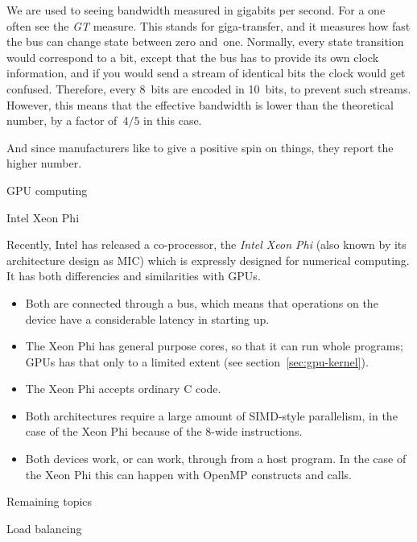  We are used to seeing bandwidth
measured in gigabits per second. For a  one often
see the \emph{GT} measure. This stands
for giga-transfer, and it measures how fast the bus can change state
between zero and~one.
Normally, every state transition would correspond to a bit, except that
the bus has to provide its own clock information, and if you would send a stream
of identical bits the clock would get confused. Therefore, every 8~bits
are encoded in 10~bits, to prevent such streams. However, this means
that the effective bandwidth is lower than the theoretical number,
by a factor of~$4/5$ in this case.

And since manufacturers like to give a positive spin on things,
they report the higher number.

 {GPU computing}
\label{sec:gpu}


 {Intel Xeon Phi}

Recently, Intel has released a co-processor, the \emph{Intel Xeon Phi}
(also known by its architecture design as \ac{MIC})
which is expressly designed for numerical computing.
It has both differencies and similarities with \acp{GPU}.
\begin{itemize}
\item Both are connected through a  bus, which means
  that operations on the device have a considerable latency in
  starting up.
\item The Xeon Phi has general purpose cores, so that it can run whole
  programs; \acp{GPU} has that only to a limited extent (see
  section~\ref{sec:gpu-kernel}).
\item The Xeon Phi accepts ordinary C code.
\item Both architectures require a large amount of SIMD-style
  parallelism, in the case of the Xeon Phi because of the 8-wide
   instructions.
\item Both devices work, or can work, through 
  from a host program. In the case of the Xeon Phi this can happen
  with OpenMP constructs and  calls.
\end{itemize}


 {Remaining topics}

 {Load balancing}
\label{sec:load}

 
